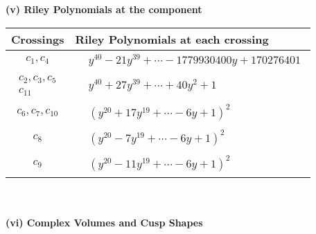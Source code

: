 \documentclass[1p]{elsarticle_modified}
\theoremstyle{definition}
\begin{document}
\newpage\renewcommand{\arraystretch}{1}
\flushleft \textbf{(v) Riley Polynomials at the component}\newline \\
\begin{tabular}{m{50pt}|m{274pt}}
Crossings & \hspace{64pt}Riley Polynomials at each crossing \\
\hline $$\begin{aligned}c_{1},c_{4}\end{aligned}$$&$\begin{aligned}
&y^{40}-21 y^{39}+\cdots-1779930400 y+170276401
\end{aligned}$\\
\hline $$\begin{aligned}c_{2},c_{3},c_{5}\\c_{11}\end{aligned}$$&$\begin{aligned}
&y^{40}+27 y^{39}+\cdots+40 y^2+1
\end{aligned}$\\
\hline $$\begin{aligned}c_{6},c_{7},c_{10}\end{aligned}$$&$\begin{aligned}
&(y^{20}+17 y^{19}+\cdots-6 y+1)^{2}
\end{aligned}$\\
\hline $$\begin{aligned}c_{8}\end{aligned}$$&$\begin{aligned}
&(y^{20}-7 y^{19}+\cdots-6 y+1)^{2}
\end{aligned}$\\
\hline $$\begin{aligned}c_{9}\end{aligned}$$&$\begin{aligned}
&(y^{20}-11 y^{19}+\cdots-6 y+1)^{2}
\end{aligned}$\\
\hline
\end{tabular}\\~\\
\newpage\flushleft \textbf{(vi) Complex Volumes and Cusp Shapes}
\end{document}
